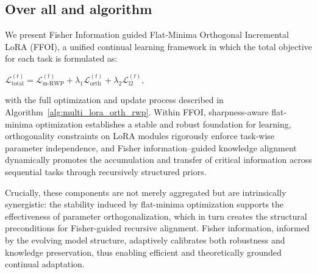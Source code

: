 \documentclass[letterpaper]{article} %
\begin{document}


\subsection{Over all and algorithm}

We present Fisher Information guided Flat-Minima Orthogonal Incremental LoRA (FFOI), a unified continual learning framework in which the total objective for each task is formulated as:

$\mathcal{L}_{\text{total}}^{(t)} = \mathcal{L}_{\mathrm{m\text{-}RWP}}^{(t)} + \lambda_1 \mathcal{L}_{\text{orth}}^{(t)} + \lambda_2 \mathcal{L}_{\text{l2}}^{(t)},$

with the full optimization and update process described in Algorithm~\ref{alg:multi_lora_orth_rwp}. Within FFOI, sharpness-aware flat-minima optimization establishes a stable and robust foundation for learning, orthogonality constraints on LoRA modules rigorously enforce task-wise parameter independence, and Fisher information–guided knowledge alignment dynamically promotes the accumulation and transfer of critical information across sequential tasks through recursively structured priors.

Crucially, these components are not merely aggregated but are intrinsically synergistic: the stability induced by flat-minima optimization supports the effectiveness of parameter orthogonalization, which in turn creates the structural preconditions for Fisher-guided recursive alignment. Fisher information, informed by the evolving model structure, adaptively calibrates both robustness and knowledge preservation, thus enabling efficient and theoretically grounded continual adaptation.
\end{document}

